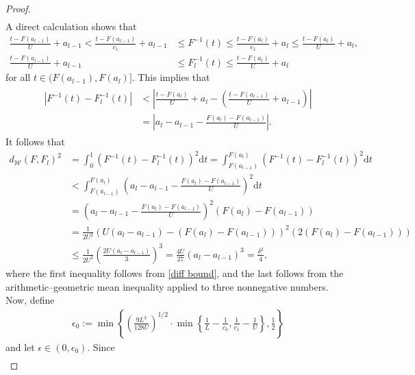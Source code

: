 \documentclass[10pt,a4paper]{amsart}
\begin{document}
\begin{proof}
\begin{align*}
    \end{align*}
    A direct calculation shows that
    \begin{align*}
        \frac{t-F(a_{l-1})}{U} + a_{l-1} < \frac{t-F(a_{l-1})}{c_1}+ a_{l-1} &\le F^{-1} (t) \le \frac{t-F(a_{l})}{c_1} + a_{l} \le \frac{t-F(a_{l})}{U} + a_{l}, \\
        \frac{t-F(a_{l-1})}{U} + a_{l-1} &\le F_l^{-1} (t) \le \frac{t-F(a_{l})}{U} + a_{l}
    \end{align*}
    for all $t\in(F(a_{l-1}),F(a_l)]$.
    This implies that
    \begin{align}\label{diff bound}
    \begin{split}
    |F^{-1}(t)-F^{-1}_l(t)| & < \left|\frac{t-F(a_{l})}{U} + a_{l}-\left(\frac{t-F(a_{l-1})}{U} + a_{l-1}\right) \right| \\
    & = \left|a_{l} - a_{l-1} - \frac{F(a_l) -F(a_{l-1})}{U}\right|.
    \end{split}
    \end{align}
    It follows that
    \begin{align*}
        d_{\mathcal{W}} \left(F, F_l \right)^2 & = \int_0^1 (F^{-1}(t)- F_l^{-1}(t))^2 \mathrm{d}t
        = \int_{F(a_{l-1})}^{F(a_l)} \left(F^{-1}(t) - F_l^{-1}(t) \right)^2 \mathrm{d}t \\
        &< \int_{F(a_{l-1})}^{F(a_l)} \left(a_{l} - a_{l-1} - \frac{F(a_l) -F(a_{l-1})}{U}\right)^2 \mathrm{d}t \\
        & = \left(a_{l} - a_{l-1} - \frac{F(a_l) -F(a_{l-1})}{U}\right)^2 \left( F(a_l) -  F(a_{l-1}) \right) \\
        & = \frac{1}{2U^2} \left(U (a_{l} - a_{l-1}) - (F(a_l) -F(a_{l-1})) \right)^2 \left( 2( F(a_l) -  F(a_{l-1}) ) \right) \\
        & \le \frac{1}{2U^2} \left( \frac{2U(a_{l} - a_{l-1})}{3} \right)^3 = \frac{4U}{27} (a_{l} - a_{l-1})^3 = \frac{\delta^2}{4},
    \end{align*}
    where the first inequality follows from \eqref{diff bound}, and the last follows from the arithmetic--geometric mean inequality applied to three nonnegative numbers. Now, define
    \begin{align*}
        \epsilon_0 := \min \left\{ \left(\frac{9L^3}{128U}\right)^{1/2} \cdot \min \left\{ \frac{1}{L} - \frac{1}{c_0} , \frac{1}{c_1}- \frac{1}{U} \right\}, \frac{1}{2} \right\}
    \end{align*}
    and let $\epsilon \in \left(0, \epsilon_0 \right)$. Since
    \begin{align*}

\end{align*}
\end{proof}
\end{document}
